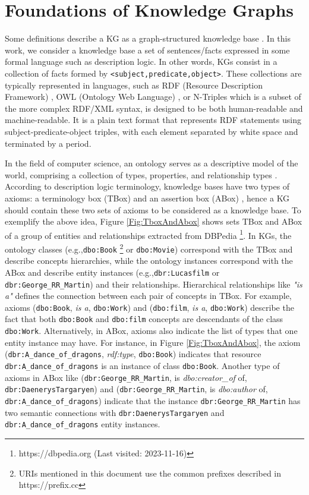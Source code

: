 \documentclass{ieeeaccess}
\begin{document}
\section{Foundations of Knowledge Graphs}
\label{sec:KG}

Some definitions describe a KG as a graph-structured
knowledge base \cite{nickel2015review, 
seufert2016instant}. In this work, we consider a
knowledge base a set of sentences/facts expressed in
some formal language such as description logic. In 
other words, KGs consist in a collection of facts 
formed by \texttt{<subject,predicate,object>}. These
collections are typically represented in languages, 
such as RDF (Resource Description Framework) \cite{RDF},
OWL (Ontology Web Language) \cite{OWL}, or N-Triples 
which is a subset of the more complex RDF/XML syntax,
is designed to be both human-readable and 
machine-readable. It is a plain text format that 
represents RDF statements using 
subject-predicate-object triples, with
each element separated by white space and terminated
by a period.

In the field of computer science, an ontology serves as a 
descriptive model of the world, comprising a collection of
types, properties, and relationship types 
\cite{Garshol2004MetadataTT}. According to description logic 
terminology, knowledge bases have two types of axioms: a 
terminology box (TBox) and an assertion box (ABox) 
\cite{horrocks2008ontologies}, hence a KG should contain
these two sets of axioms to be considered as a knowledge base.
To exemplify the above idea, Figure \ref{Fig:TboxAndAbox} 
shows sets TBox and ABox of a group of entities and 
relationships extracted from DBPedia \cite{auer2007dbpedia} 
\footnote{https://dbpedia.org (Last visited: 2023-11-16)}. In 
KGs, the ontology classes (e.g.,\texttt{dbo:Book} 
\footnote{URIs mentioned in this document use the 
common prefixes described in https://prefix.cc} or 
\texttt{dbo:Movie}) correspond with the TBox and 
describe concepts hierarchies, while the ontology 
instances correspond with the ABox and describe entity 
instances (e.g.,\texttt{dbr:Lucasfilm} or 
\texttt{dbr:George\_RR\_Martin}) and their
relationships. Hierarchical relationships like 
\textit{"is a"} defines the connection between each 
pair of concepts in TBox. For example, axioms 
(\texttt{dbo:Book}, \textit{is a}, 
\texttt{dbo:Work}) and (\texttt{dbo:film},
\textit{is a}, 
\texttt{dbo:Work}) describe the fact that both 
\texttt{dbo:Book} 
and \texttt{dbo:film} concepts are descendants of the 
class
\texttt{dbo:Work}. Alternatively, in ABox, axioms also
indicate the list of types that one entity instance may
have. For instance, in Figure \ref{Fig:TboxAndAbox}, 
the axiom (\texttt{dbr:A\_dance\_of\_dragons}, 
\textit{rdf:type},
\texttt{dbo:Book}) indicates that resource
\texttt{dbr:A\_dance\_of\_dragons} is an instance
of class
\texttt{dbo:Book}. Another type of axioms in ABox like
(\texttt{dbr:George\_RR\_Martin}, is 
\textit{dbo:creator\_of}
of, \texttt{dbr:DaenerysTargaryen}) and 
(\texttt{dbr:George\_RR\_Martin}, is 
\textit{dbo:author} of,
\texttt{dbr:A\_dance\_of\_dragons}) indicate
that the instance \texttt{dbr:George\_RR\_Martin} has 
two semantic connections with 
\texttt{dbr:DaenerysTargaryen} and 
\texttt{dbr:A\_dance\_of\_dragons} entity instances.
\end{document}
